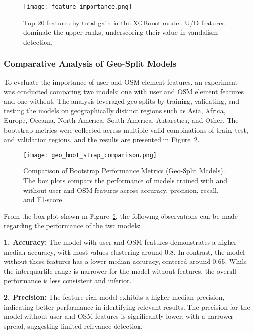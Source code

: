 \documentclass[
    13pt, %
    a4paper, %
    DIV14, %
    listof=totoc, %
    bibliography=totoc, %
    index=totoc, %
    headsepline
]{scrreprt}
\begin{document}
\begin{figure}[H]
    \centering
    \texttt{[image: feature\_importance.png]}
    \caption{Top 20 features by total gain in the XGBoost model. U/O features dominate the upper ranks, underscoring their value in vandalism detection.}
    \label{fig:feature_importance}
\end{figure}

\subsubsection{Comparative Analysis of Geo-Split Models}
\label{sec:geo_split_analysis}

To evaluate the importance of user and OSM element features, an experiment was conducted comparing two models: one with user and OSM element features and one without. The analysis leveraged geo-splits by training, validating, and testing the models on geographically distinct regions such as Asia, Africa, Europe, Oceania, North America, South America, Antarctica, and Other. The bootstrap metrics were collected across multiple valid combinations of train, test, and validation regions, and the results are presented in Figure~\ref{fig:geo_bootstrap_comparison}.

\begin{figure}[H]
    \centering
    \texttt{[image: geo\_boot\_strap\_comparison.png]}
    \caption{Comparison of Bootstrap Performance Metrics (Geo-Split Models). The box plots compare the performance of models trained with and without user and OSM features across accuracy, precision, recall, and F1-score.}
    \label{fig:geo_bootstrap_comparison}
\end{figure}

From the box plot shown in Figure~\ref{fig:geo_bootstrap_comparison}, the following observations can be made regarding the performance of the two models:

\textbf{1. Accuracy:} The model with user and OSM features demonstrates a higher median accuracy, with most values clustering around 0.8. In contrast, the model without these features has a lower median accuracy, centered around 0.65. While the interquartile range is narrower for the model without features, the overall performance is less consistent and inferior.

\textbf{2. Precision:} The feature-rich model exhibits a higher median precision, indicating better performance in identifying relevant results. The precision for the model without user and OSM features is significantly lower, with a narrower spread, suggesting limited relevance detection.
\end{document}
